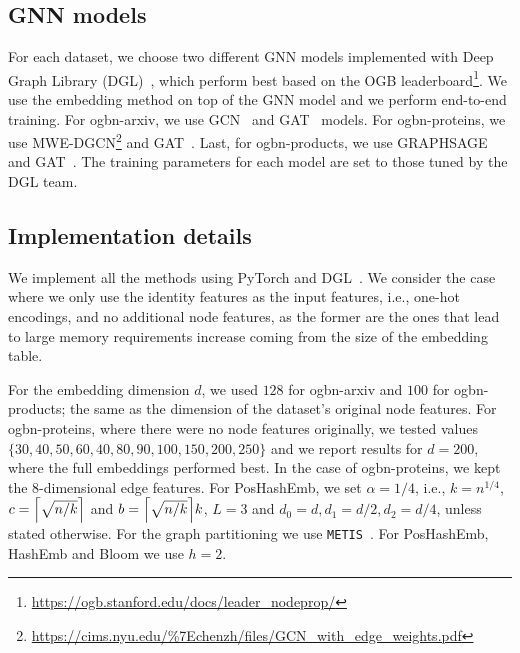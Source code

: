 \documentclass[conference]{IEEEtran}
\DeclarePairedDelimiter{\ceil}{\lceil}{\rceil}
\begin{document}
\subsection{GNN models}
For each dataset, we choose two different GNN models implemented with Deep Graph Library (DGL)~\cite{wang2019dgl}, which perform best based on the OGB leaderboard\footnote{\url{https://ogb.stanford.edu/docs/leader_nodeprop/}}. We use the embedding method on top of the GNN model and we perform end-to-end training. For ogbn-arxiv, we use GCN~\cite{kipf2016semi} and GAT~\cite{velivckovic2017graph} models. For ogbn-proteins, we use MWE-DGCN\footnote{\url{https://cims.nyu.edu/\%7Echenzh/files/GCN_with_edge_weights.pdf}} and GAT~\cite{velivckovic2017graph}. Last, for ogbn-products, we use GRAPHSAGE~\cite{hamilton2017inductive} and GAT~\cite{velivckovic2017graph}. The training parameters for each model are set to those tuned by the DGL team.


\subsection{Implementation details}
\label{sec:impl_details}
We implement all the methods using PyTorch and  DGL~\cite{wang2019dgl}.
% 
We consider the case where we only use the identity features as the input features, i.e., one-hot encodings, and no additional node features, as the former are the ones that lead to large memory requirements increase coming from the size of the embedding table.
 
For the embedding dimension $d$, we used $128$ for ogbn-arxiv and $100$ for ogbn-products; the same as the dimension of the dataset's original node features. For ogbn-proteins, where there were no node features originally, we tested values $\{30,40,50,60,40,80,90,100,150,200,250\}$ and we report results for $d=200$, where the full embeddings performed best. In the case of ogbn-proteins, we kept the $8$-dimensional edge features.
% 
For PosHashEmb, we set $\alpha=1/4$, i.e., $k=n^{1/4}$, $c=\ceil*{\sqrt{n/k}}$ and $b=\ceil*{\sqrt{n/k}} k$, $L=3$ and $d_0=d, d_1=d/2, d_2=d/4$, unless stated otherwise. For the graph partitioning we use \texttt{METIS}~\cite{karypis1997metis}.
% 
%
For PosHashEmb, HashEmb and Bloom we use $h=2$.
\end{document}
